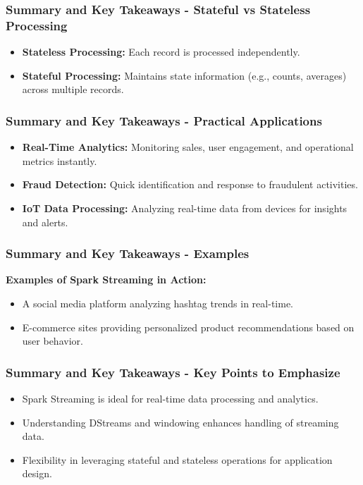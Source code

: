 \documentclass[aspectratio=169]{beamer}
\begin{document}
\begin{frame}
    \frametitle{Summary and Key Takeaways - Stateful vs Stateless Processing}
    \begin{itemize}
        \item \textbf{Stateless Processing:} Each record is processed independently.
        \item \textbf{Stateful Processing:} Maintains state information (e.g., counts, averages) across multiple records.
    \end{itemize}
\end{frame}

\begin{frame}
    \frametitle{Summary and Key Takeaways - Practical Applications}
    \begin{itemize}
        \item \textbf{Real-Time Analytics:} Monitoring sales, user engagement, and operational metrics instantly.
        \item \textbf{Fraud Detection:} Quick identification and response to fraudulent activities.
        \item \textbf{IoT Data Processing:} Analyzing real-time data from devices for insights and alerts.
    \end{itemize}
\end{frame}

\begin{frame}[fragile]
    \frametitle{Summary and Key Takeaways - Examples}
    \textbf{Examples of Spark Streaming in Action:}
    \begin{itemize}
        \item A social media platform analyzing hashtag trends in real-time.
        \item E-commerce sites providing personalized product recommendations based on user behavior.
    \end{itemize}
\end{frame}

\begin{frame}
    \frametitle{Summary and Key Takeaways - Key Points to Emphasize}
    \begin{itemize}
        \item Spark Streaming is ideal for real-time data processing and analytics.
        \item Understanding DStreams and windowing enhances handling of streaming data.
        \item Flexibility in leveraging stateful and stateless operations for application design.
    \end{itemize}
\end{frame}
\end{document}
